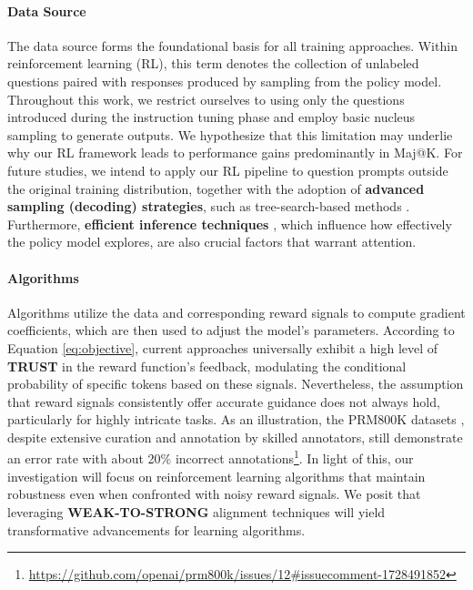 \begin{itemize}[topsep=0pt]
\begin{itemize}[topsep=0pt]
\paragraph{Data Source} The data source forms the foundational basis for all training approaches. Within reinforcement learning (RL), this term denotes the collection of unlabeled questions paired with responses produced by sampling from the policy model. Throughout this work, we restrict ourselves to using only the questions introduced during the instruction tuning phase and employ basic nucleus sampling to generate outputs. We hypothesize that this limitation may underlie why our RL framework leads to performance gains predominantly in Maj@K. For future studies, we intend to apply our RL pipeline to question prompts outside the original training distribution, together with the adoption of \textbf{advanced sampling (decoding) strategies}, such as tree-search-based methods \citep{yao2023tree}. Furthermore, \textbf{efficient inference techniques} \citep{xia-etal-2023-speculative,leviathan2023fast,kwon2023efficient,xia2024unlocking}, which influence how effectively the policy model explores, are also crucial factors that warrant attention.

\paragraph{Algorithms} Algorithms utilize the data and corresponding reward signals to compute gradient coefficients, which are then used to adjust the model's parameters. According to Equation \ref{eq:objective}, current approaches universally exhibit a high level of \textbf{TRUST} in the reward function's feedback, modulating the conditional probability of specific tokens based on these signals. Nevertheless, the assumption that reward signals consistently offer accurate guidance does not always hold, particularly for highly intricate tasks. As an illustration, the PRM800K datasets \citep{lightman2023let}, despite extensive curation and annotation by skilled annotators, still demonstrate an error rate with about 20\% incorrect annotations\footnote{\url{https://github.com/openai/prm800k/issues/12\#issuecomment-1728491852}}. In light of this, our investigation will focus on reinforcement learning algorithms that maintain robustness even when confronted with noisy reward signals. We posit that leveraging \textbf{WEAK-TO-STRONG} \citep{burns2023weak} alignment techniques will yield transformative advancements for learning algorithms.


\end{itemize}
\end{itemize}
